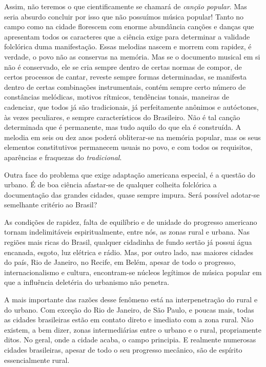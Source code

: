 Assim, não teremos o que cientificamente se chamará de \textit{canção
popular}. Mas seria absurdo concluir por isso que não possuímos música
popular! Tanto no campo como na cidade florescem com enorme abundância
canções e danças que apresentam todos os caracteres que a ciência exige
para determinar a validade folclórica duma manifestação. Essas melodias
nascem e morrem com rapidez, é verdade, o povo não as conservas na
memória. Mas se o documento musical em si não é conservado, ele se cria
sempre dentro de certas normas de compor, de certos processos de cantar,
reveste sempre formas determinadas, se manifesta dentro de certas
combinações instrumentais, contém sempre certo número de constâncias
melódicas, motivos rítmicos, tendências tonais, maneiras de cadenciar,
que todos já são tradicionais, já perfeitamente anônimos e autóctones,
às vezes peculiares, e sempre característicos do Brasileiro. Não é tal
canção determinada que é permanente, mas tudo aquilo do que ela é
construída. A melodia em seis ou dez anos poderá obliterar-se na memória
popular, mas os seus elementos constitutivos permanecem usuais no povo,
e com todos os requisitos, aparências e fraquezas do \textit{tradicional}.

Outra face do problema que exige adaptação americana especial, é a
questão do urbano. É de boa ciência afastar-se de qualquer colheita
folclórica a documentação das grandes cidades, quase sempre impura. Será
possível adotar-se semelhante critério ao Brasil?

As condições de rapidez, falta de equilíbrio e de unidade do progresso
americano tornam indelimitáveis espiritualmente, entre nós, as zonas
rural e urbana. Nas regiões mais ricas do Brasil, qualquer cidadinha de
fundo sertão já possui água encanada, esgoto, luz elétrica e rádio. Mas,
por outro lado, nas maiores cidades do país, Rio de Janeiro, no Recife,
em Belém, apesar de todo o progresso, internacionalismo e cultura,
encontram-se núcleos legítimos de música popular em que a influência
deletéria do urbanismo não penetra.

A mais importante das razões desse fenômeno está na interpenetração do
rural e do urbano. Com exceção do Rio de Janeiro, de São Paulo, e poucas
mais, todas as cidades brasileiras estão em contato direto e imediato
com a zona rural. Não existem, a bem dizer, zonas intermediárias entre o
urbano e o rural, propriamente ditos. No geral, onde a cidade acaba, o
campo principia. E realmente numerosas cidades brasileiras, apesar de
todo o seu progresso mecânico, são de espírito essencialmente rural.

